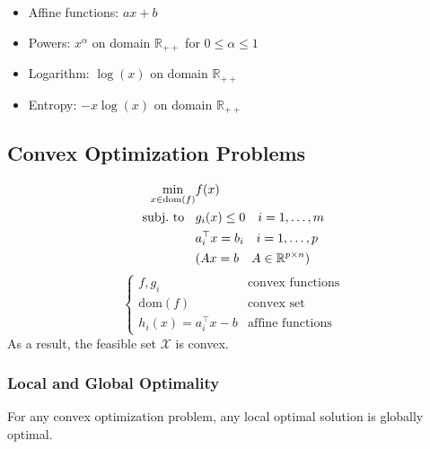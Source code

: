 \newpar{}

\begin{itemize}
    \item Affine functions: $ ax + b$
    \item Powers: $x^\alpha$ on domain $\mathbb{R}_{++}$ for $0\leq\alpha \leq 1$
    \item Logarithm: $\log(x)$ on domain $\mathbb{R}_{++}$
    \item Entropy: $-x\log(x)$ on domain $\mathbb{R}_{++}$
\end{itemize}

\subsection{Convex Optimization Problems}
\noindent\begin{align*}
    \min_{x\in\mathrm{dom}(f)} & f(x)                                     \\
    \text{subj.\ to\;\; }      & g_i(x)\leq0\quad i=1,\ldots,m            \\
                               & a_i^{\top} x=b_i \quad i=1,\ldots,p      \\
                               & (Ax =b\quad A\in \mathbb{R}^{p\times n})
\end{align*}
\begin{equation*}
    \begin{cases}
        f,g_i                    & \text{convex functions} \\
        \mathrm{dom}(f)          & \text{convex set}       \\
        h_i(x) = a_i^{\top} x -b & \text{affine functions}
    \end{cases}
\end{equation*}
As a result, the feasible set $\mathcal{X}$ is convex.

\subsubsection{Local and Global Optimality}
For any convex optimization problem, any local optimal solution is globally optimal.

